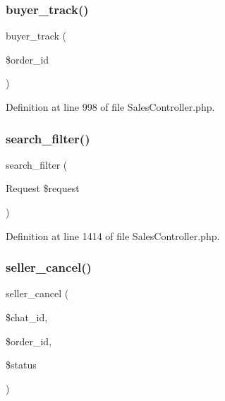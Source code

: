 \subsubsection{\texorpdfstring{buyer\_track()}{buyer\_track()}}
{\footnotesize\ttfamily buyer\+\_\+track (\begin{DoxyParamCaption}\item[{}]{\$order\+\_\+id }\end{DoxyParamCaption})}



Definition at line 998 of file Sales\+Controller.\+php.

\mbox{\label{class_responsive_1_1_http_1_1_controllers_1_1_sales_controller_a3943fd5c1dc7b10adc4f2b77b67b5860}} 
\subsubsection{\texorpdfstring{search\_filter()}{search\_filter()}}
{\footnotesize\ttfamily search\+\_\+filter (\begin{DoxyParamCaption}\item[{Request}]{\$request }\end{DoxyParamCaption})}



Definition at line 1414 of file Sales\+Controller.\+php.

\mbox{\label{class_responsive_1_1_http_1_1_controllers_1_1_sales_controller_a54c733ab6d5dfcff2ae4c96bd2cba854}} 
\subsubsection{\texorpdfstring{seller\_cancel()}{seller\_cancel()}}
{\footnotesize\ttfamily seller\+\_\+cancel (\begin{DoxyParamCaption}\item[{}]{\$chat\+\_\+id,  }\item[{}]{\$order\+\_\+id,  }\item[{}]{\$status }\end{DoxyParamCaption})}



